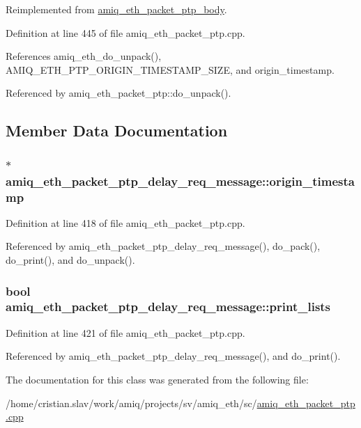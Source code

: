 Reimplemented from \hyperlink{classamiq__eth__packet__ptp__body_a17a10ad537b6553f35b54d2f037d4f0d}{amiq\_\-eth\_\-packet\_\-ptp\_\-body}.

Definition at line 445 of file amiq\_\-eth\_\-packet\_\-ptp.cpp.

References amiq\_\-eth\_\-do\_\-unpack(), AMIQ\_\-ETH\_\-PTP\_\-ORIGIN\_\-TIMESTAMP\_\-SIZE, and origin\_\-timestamp.

Referenced by amiq\_\-eth\_\-packet\_\-ptp::do\_\-unpack().

\subsection{Member Data Documentation}
\hypertarget{classamiq__eth__packet__ptp__delay__req__message_a7cb4eb7b14be4ac43a1628330093184c}{
\subsubsection[{origin\_\-timestamp}]{$\ast$ {\bf amiq\_\-eth\_\-packet\_\-ptp\_\-delay\_\-req\_\-message::origin\_\-timestamp}}}
\label{classamiq__eth__packet__ptp__delay__req__message_a7cb4eb7b14be4ac43a1628330093184c}


Definition at line 418 of file amiq\_\-eth\_\-packet\_\-ptp.cpp.

Referenced by amiq\_\-eth\_\-packet\_\-ptp\_\-delay\_\-req\_\-message(), do\_\-pack(), do\_\-print(), and do\_\-unpack().\hypertarget{classamiq__eth__packet__ptp__delay__req__message_a1f833793f6438b06b6f26ce40ae1cd83}{
\subsubsection[{print\_\-lists}]{\setlength{\rightskip}{0pt plus 5cm}bool {\bf amiq\_\-eth\_\-packet\_\-ptp\_\-delay\_\-req\_\-message::print\_\-lists}}}
\label{classamiq__eth__packet__ptp__delay__req__message_a1f833793f6438b06b6f26ce40ae1cd83}


Definition at line 421 of file amiq\_\-eth\_\-packet\_\-ptp.cpp.

Referenced by amiq\_\-eth\_\-packet\_\-ptp\_\-delay\_\-req\_\-message(), and do\_\-print().

The documentation for this class was generated from the following file:\begin{DoxyCompactItemize}
\item 
/home/cristian.slav/work/amiq/projects/sv/amiq\_\-eth/sc/\hyperlink{amiq__eth__packet__ptp_8cpp}{amiq\_\-eth\_\-packet\_\-ptp.cpp}\end{DoxyCompactItemize}
